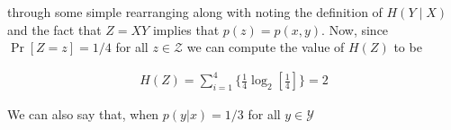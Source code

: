\documentclass[ClusteringConnectionsMAIN.tex]{subfiles}
\begin{document}
through some simple rearranging along with noting the definition of $H \left( Y \mid X \right)$ and the fact that $Z = X Y$ implies that $p \left( z \right) = p \left( x, y \right)$.  Now, since $\Pr \left[ Z = z \right] = 1 / 4$ for all $z \in \mathcal{Z}$ we can compute the value of $H \left( Z \right)$ to be

\begin{align} \label{c2p24eq2}
H \left( Z \right) = \sum_{i=1}^4 \biggl\{ \frac{1}{4} \log_2 \left[ \frac{1}{4} \right] \biggr\} = 2  \tag{2.24-2}
\end{align}

We can also say that, when $p \left( y | x \right) = 1/3$ for all $y \in \mathcal{Y}$
\end{document}
